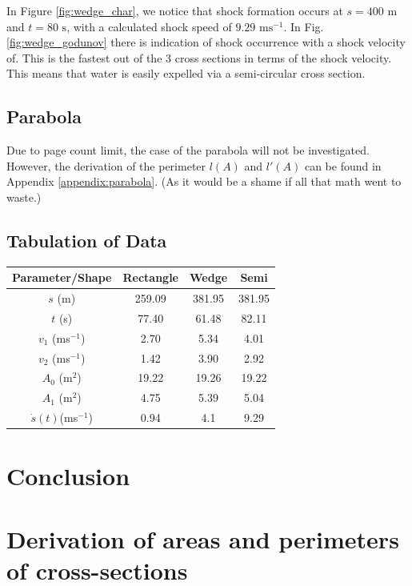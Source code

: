 \documentclass[12pt]{article}
\begin{document}
In Figure \ref{fig:wedge_char}, we notice that shock formation occurs at $s= 400\text{ m}$ and $t= 80\text{ s}$, with a calculated shock speed of $ 9.29\text{ ms}^{-1}$. In Fig. \ref{fig:wedge_godunov} there is indication of shock occurrence with a shock velocity of. This is the fastest out of the 3 cross sections in terms of the shock velocity. This means that water is easily expelled via a semi-circular cross section.

\subsection{Parabola}
Due to page count limit, the case of the parabola will not be investigated. However, the derivation of the perimeter $l(A)$ and $l'(A)$ can be found in Appendix \ref{appendix:parabola}. (As it would be a shame if all that math went to waste.)
\subsection{Tabulation of Data}
\begin{tabular}{|c|c|c|c|}
    \hline
    Parameter/Shape & Rectangle & Wedge & Semi \\
    \hline
     $s$ (m) & 259.09 & 381.95 & 381.95 \\
     \hline
     $t$ (s) & 77.40 & 61.48 & 82.11 \\
     \hline
     $v_1$ (ms$^{-1}$) & 2.70 & 5.34 & 4.01 \\
     \hline
     $v_2$ (ms$^{-1}$)& 1.42 & 3.90 & 2.92 \\
     \hline
     $A_0$ (m$^{2}$)& 19.22 & 19.26 & 19.22 \\
     \hline
     $A_1$ (m$^{2}$)& 4.75 & 5.39 & 5.04 \\
     \hline
     $\dot{s}(t)$(ms$^{-1}$) & 0.94 & 4.1 & 9.29 \\
     \hline
    
\end{tabular}
\section{Conclusion}
\newpage



\newpage
\appendix
\section{Derivation of areas and perimeters of cross-sections}
\end{document}
